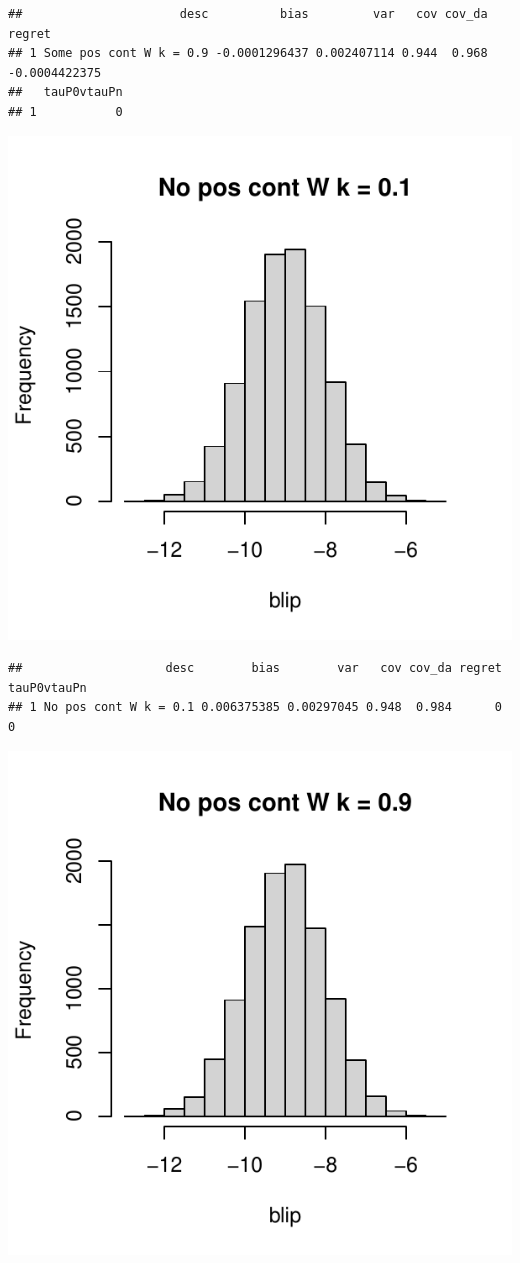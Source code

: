 \documentclass[11pt]{article}\usepackage[]{graphicx}\usepackage[table]{xcolor}
\makeatletter
\def\maxwidth{ %
  \ifdim\Gin@nat@width>\linewidth
    \linewidth
  \else
    \Gin@nat@width
  \fi
}
\newenvironment{kframe}{%
 \def\at@end@of@kframe{}%
 \ifinner\ifhmode%
  \def\at@end@of@kframe{\end{minipage}}%
  \begin{minipage}{\columnwidth}%
 \fi\fi%
 \def\FrameCommand##1{\hskip\@totalleftmargin \hskip-\fboxsep
 \colorbox{shadecolor}{##1}\hskip-\fboxsep
     \hskip-\linewidth \hskip-\@totalleftmargin \hskip\columnwidth}%
 \MakeFramed {\advance\hsize-\width
   \@totalleftmargin\z@ \linewidth\hsize
   \@setminipage}}%
 {\par\unskip\endMakeFramed%
 \at@end@of@kframe}
\newenvironment{knitrout}{}{} %
\makeatother
\begin{document}
\begin{knitrout}
\begin{kframe}\begin{verbatim}
##                      desc          bias         var   cov cov_da        regret
## 1 Some pos cont W k = 0.9 -0.0001296437 0.002407114 0.944  0.968 -0.0004422375
##   tauP0vtauPn
## 1           0
\end{verbatim}
\end{kframe}
\includegraphics[width=\maxwidth]{figure/unnamed-chunk-4-11} 
\begin{kframe}\begin{verbatim}
##                    desc        bias        var   cov cov_da regret tauP0vtauPn
## 1 No pos cont W k = 0.1 0.006375385 0.00297045 0.948  0.984      0           0
\end{verbatim}
\end{kframe}
\includegraphics[width=\maxwidth]{figure/unnamed-chunk-4-12} 

\end{knitrout}
\end{document}
